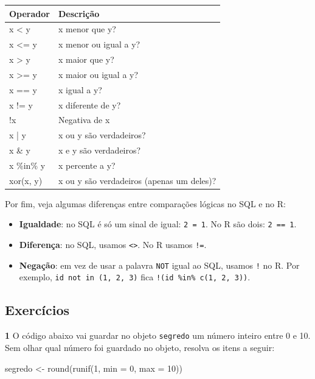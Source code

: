 \documentclass[
]{book}
\newenvironment{Shaded}{\begin{snugshade}}{\end{snugshade}}
\newcommand{\AttributeTok}[1]{\textcolor[rgb]{0.77,0.63,0.00}{#1}}
\newcommand{\DecValTok}[1]{\textcolor[rgb]{0.00,0.00,0.81}{#1}}
\newcommand{\FunctionTok}[1]{\textcolor[rgb]{0.00,0.00,0.00}{#1}}
\newcommand{\NormalTok}[1]{#1}
\newcommand{\OtherTok}[1]{\textcolor[rgb]{0.56,0.35,0.01}{#1}}
\providecommand{\tightlist}{%
  \setlength{\itemsep}{0pt}\setlength{\parskip}{0pt}}
\begin{document}
\begin{tabular}{l|l}
\hline
Operador & Descrição\\
\hline
x < y & x menor que y?\\
\hline
x <= y & x menor ou igual a y?\\
\hline
x > y & x maior que y?\\
\hline
x >= y & x maior ou igual a y?\\
\hline
x == y & x igual a y?\\
\hline
x != y & x diferente de y?\\
\hline
!x & Negativa de x\\
\hline
x | y & x ou y são verdadeiros?\\
\hline
x \& y & x e y são verdadeiros?\\
\hline
x \%in\% y & x percente a y?\\
\hline
xor(x, y) & x ou y são verdadeiros (apenas um deles)?\\
\hline
\end{tabular}

Por fim, veja algumas diferenças entre comparações lógicas no SQL e no R:

\begin{itemize}
\tightlist
\item
  \textbf{Igualdade}: no SQL é só um sinal de igual: \texttt{2\ =\ 1}. No R são dois: \texttt{2\ ==\ 1}.
\item
  \textbf{Diferença}: no SQL, usamos \texttt{\textless{}\textgreater{}}. No R usamos \texttt{!=}.
\item
  \textbf{Negação}: em vez de usar a palavra \texttt{NOT} igual ao SQL, usamos \texttt{!} no R. Por exemplo, \texttt{id\ not\ in\ (\textquotesingle{}1\textquotesingle{},\ \textquotesingle{}2\textquotesingle{},\ \textquotesingle{}3\textquotesingle{})} fica \texttt{!(id\ \%in\%\ c(1,\ 2,\ 3))}.
\end{itemize}

\hypertarget{exercuxedcios-4}{%
\subsection*{Exercícios}\label{exercuxedcios-4}}

\textbf{1} O código abaixo vai guardar no objeto \texttt{segredo} um número inteiro entre 0 e 10. Sem olhar qual número foi guardado no objeto, resolva os itens a seguir:

\begin{Shaded}
\begin{Highlighting}[]
\NormalTok{segredo }\OtherTok{\textless{}{-}} \FunctionTok{round}\NormalTok{(}\FunctionTok{runif}\NormalTok{(}\DecValTok{1}\NormalTok{, }\AttributeTok{min =} \DecValTok{0}\NormalTok{, }\AttributeTok{max =} \DecValTok{10}\NormalTok{))}
\end{Highlighting}
\end{Shaded}
\end{document}
